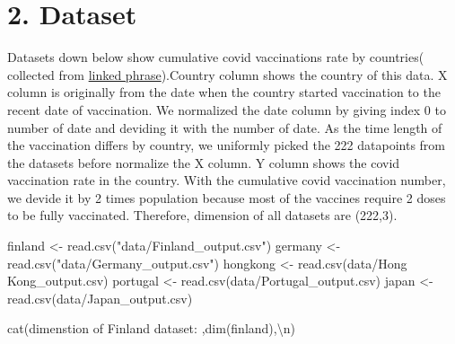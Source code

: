\documentclass[
]{article}
\newenvironment{Shaded}{\begin{snugshade}}{\end{snugshade}}
\newcommand{\FunctionTok}[1]{\textcolor[rgb]{0.00,0.00,0.00}{#1}}
\newcommand{\NormalTok}[1]{#1}
\newcommand{\OtherTok}[1]{\textcolor[rgb]{0.56,0.35,0.01}{#1}}
\newcommand{\SpecialCharTok}[1]{\textcolor[rgb]{0.00,0.00,0.00}{#1}}
\newcommand{\StringTok}[1]{\textcolor[rgb]{0.31,0.60,0.02}{#1}}
\begin{document}
\hypertarget{dataset}{%
\section{2. Dataset}\label{dataset}}

Datasets down below show cumulative covid vaccinations rate by
countries( collected from
\href{https://ourworldindata.org/covid-vaccinations}{linked
phrase}).Country column shows the country of this data. X column is
originally from the date when the country started vaccination to the
recent date of vaccination. We normalized the date column by giving
index 0 to number of date and deviding it with the number of date. As
the time length of the vaccination differs by country, we uniformly
picked the 222 datapoints from the datasets before normalize the X
column. Y column shows the covid vaccination rate in the country. With
the cumulative covid vaccination number, we devide it by 2 times
population because most of the vaccines require 2 doses to be fully
vaccinated. Therefore, dimension of all datasets are (222,3).

\begin{Shaded}
\begin{Highlighting}[]
\NormalTok{finland }\OtherTok{\textless{}{-}} \FunctionTok{read.csv}\NormalTok{(}\StringTok{"data/Finland\_output.csv"}\NormalTok{)}
\NormalTok{germany }\OtherTok{\textless{}{-}} \FunctionTok{read.csv}\NormalTok{(}\StringTok{"data/Germany\_output.csv"}\NormalTok{)}
\NormalTok{hongkong }\OtherTok{\textless{}{-}} \FunctionTok{read.csv}\NormalTok{(}\StringTok{\textquotesingle{}data/Hong Kong\_output.csv\textquotesingle{}}\NormalTok{)}
\NormalTok{portugal }\OtherTok{\textless{}{-}} \FunctionTok{read.csv}\NormalTok{(}\StringTok{\textquotesingle{}data/Portugal\_output.csv\textquotesingle{}}\NormalTok{)}
\NormalTok{japan }\OtherTok{\textless{}{-}} \FunctionTok{read.csv}\NormalTok{(}\StringTok{\textquotesingle{}data/Japan\_output.csv\textquotesingle{}}\NormalTok{)}
\end{Highlighting}
\end{Shaded}

\begin{Shaded}
\begin{Highlighting}[]
\FunctionTok{cat}\NormalTok{(}\StringTok{\textquotesingle{}dimenstion of Finland dataset: \textquotesingle{}}\NormalTok{,}\FunctionTok{dim}\NormalTok{(finland),}\StringTok{\textquotesingle{}}\SpecialCharTok{\textbackslash{}n}\StringTok{\textquotesingle{}}\NormalTok{)}
\end{Highlighting}
\end{Shaded}
\end{document}
